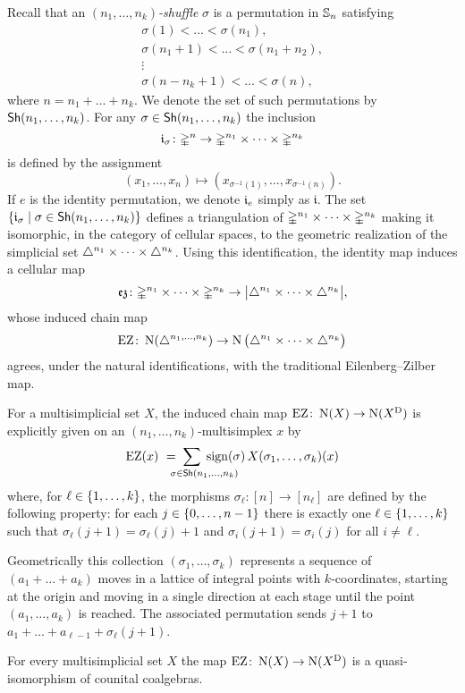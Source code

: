 Recall that an \textit{$(n_1,\dots,n_k)$-shuffle} $\sigma$ is a permutation in $\sym_n$ satisfying
\begin{gather*}
	\sigma(1) < \dots < \sigma(n_1), \\
	\sigma(n_1+1) < \dots < \sigma(n_1+n_2), \\
	\vdots \\
	\sigma(n-n_k+1) < \dots < \sigma(n),
\end{gather*}
where $n = n_1+\dots+n_k$.
We denote the set of such permutations by $\Sh(n_1,\dots,n_k)$.
For any $\sigma \in \Sh(n_1,\dots,n_k)$ the inclusion
\[
\gi_\sigma \colon \gsimplex^n \to \gmsimplex{n_1}{n_k}
\]
is defined by the assignment
\[
(x_1,\dots,x_n) \mapsto (x_{\sigma^{-1}(1)}, \dots, x_{\sigma^{-1}(n)}).
\]
If $e$ is the identity permutation, we denote $\gi_{e}$ simply as $\mathfrak{i}$.
The set $\set{\gi_\sigma \mid \sigma \in \Sh(n_1,\dots,n_k)}$ defines a triangulation of $\gmsimplex{n_1}{n_k}$ making it isomorphic, in the category of cellular spaces, to the geometric realization of the simplicial set $\msimplex{n_1}{n_k}$.
Using this identification, the identity map induces a cellular map
\[
\ez \colon \gmsimplex{n_1}{n_k} \to \bars[\big]{\msimplex{n_1}{n_k}},
\]
whose induced chain map
\[
\EZ \colon \chains(\simplex^{n_1,\dots,n_k}) \to \chains\big(\msimplex{n_1}{n_k}\big)
\]
agrees, under the natural identifications, with the traditional Eilenberg--Zilber map.

For a multisimplicial set $X$, the induced chain map $\EZ \colon \chains(X) \to \chains(X^\diag)$ is explicitly given on an $(n_1,\dots,n_k)$-multisimplex $x$ by
\[
\EZ(x) \ = \sum_{\qquad \crampedclap{\sigma \in \Sh(n_1,\dots,n_k)}} \sign(\sigma) \, X(\sigma_1 ,\dots, \sigma_k)(x)
\]
where, for $\ell \in \set{1,\dots,k}$, the morphisms $\sigma_\ell \colon [n] \to [n_\ell]$ are defined by the following property: for
each $j \in \set{0,\dots,n-1}$ there is exactly one $\ell \in \set{1,\dots,k}$ such that $\sigma_\ell(j+1) = \sigma_\ell(j)+1$ and $\sigma_i(j+1) = \sigma_i(j)$ for all $i \neq \ell$.

Geometrically this collection $(\sigma_1,\dots,\sigma_k)$ represents a sequence of $(a_1 +\dots+ a_k)$ moves in a lattice of integral points with $k$-coordinates, starting at the origin and moving in a single direction at each stage until the point $(a_1,\dots,a_k)$ is reached.
The associated permutation sends $j+1$ to $a_1 +\dots+ a_{\ell-1} + \sigma_\ell(j+1)$.

\begin{theorem}
	For every multisimplicial set $X$ the map $\EZ \colon \chains(X) \to \chains(X^\diag)$ is a quasi-isomorphism of counital coalgebras.
\end{theorem}

